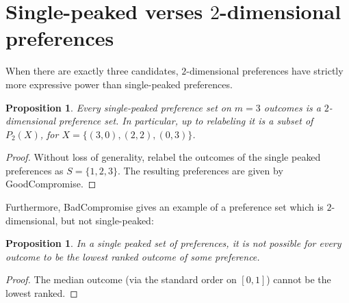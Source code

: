 \documentclass[12pt]{article}
\newtheorem{proposition}[theorem]{Proposition}
\newcommand{\1}[1]{\mathds{1}[{#1}]}
\begin{document}
\section{Single-peaked verses $2$-dimensional preferences}
  \label{sec:singleVsTwoD}

  When there are exactly three candidates, $2$-dimensional
  preferences have strictly more expressive power than
  single-peaked preferences.
  \begin{proposition}
    Every single-peaked preference set on $m=3$ outcomes
    is a $2$-dimensional preference set. In particular,
    up to relabeling it is a subset of $P_2(X)$, for
    $X = \{ (3,0), (2,2), (0,3) \}$.
  \end{proposition}
  \begin{proof}
    Without loss of generality, relabel the outcomes
    of the single peaked preferences as $S = \{1,2,3\}$.
    The resulting preferences are given by {\sc GoodCompromise}.
  \end{proof}
  Furthermore, {\sc BadCompromise} gives an example of a preference set
  which is $2$-dimensional, but not single-peaked:
  \begin{proposition} \label{prop:noLeastFavorite}
    In a single peaked set of preferences, it is not possible
    for every outcome to be the lowest ranked outcome of some preference.
  \end{proposition}
  \begin{proof}
    The median outcome (via the standard order on $[0,1]$)
    cannot be the lowest ranked.
  \end{proof}
\end{document}
